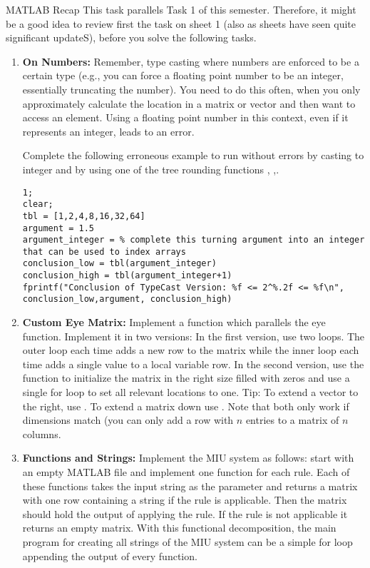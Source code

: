 \begin{task}{MATLAB Recap}{}{}
  This task parallels Task 1 of this semester. Therefore, it might be a good idea to review first the task on sheet 1 (also as sheets have seen quite significant updateS), before you solve the following tasks.

  \begin{enumerate}
  \item{\textbf{On Numbers:} Remember, type casting where numbers are enforced to be a certain type (e.g., you can force a floating point number to be an integer, essentially truncating the number). You need to do this often, when you only approximately calculate the location in a matrix or vector and then want to access an element. Using a floating point number in this context, even if it represents an integer, leads to an error.

    Complete the following erroneous example to run without errors by casting to integer and by using one of the tree rounding functions , ,.
    
    \begin{lstlisting}
1;
clear;
tbl = [1,2,4,8,16,32,64]
argument = 1.5
argument_integer = % complete this turning argument into an integer that can be used to index arrays
conclusion_low = tbl(argument_integer)
conclusion_high = tbl(argument_integer+1)
fprintf("Conclusion of TypeCast Version: %f <= 2^%.2f <= %f\n", conclusion_low,argument, conclusion_high)
      \end{lstlisting}
  }

  \item{\textbf{Custom Eye Matrix:} Implement a function  which parallels the eye function. Implement it in two versions: In the first version, use two loops. The outer loop each time adds a new row to the matrix while the inner loop each time adds a single value to a local variable row.
    In the second version, use the  function to initialize the matrix in the right size filled with zeros and use a single for loop to set all relevant locations to one.
    Tip: To extend a vector to the right, use . To extend a matrix down use . Note that both only work if dimensions match (you can only add a row with $n$ entries to a matrix of $n$ columns.
  }

  \item{\textbf{Functions and Strings:} Implement the MIU system as follows: start with an empty MATLAB file and implement one function for each rule. Each of these functions takes the input string as the parameter and returns a matrix with one row containing a string if the rule is applicable. Then the matrix should hold the output of applying the rule. If the rule is not applicable it returns an empty matrix. With this functional decomposition, the main program for creating all strings of the MIU system can be a simple for loop appending the output of every function.

}
\end{enumerate}
\end{task}
